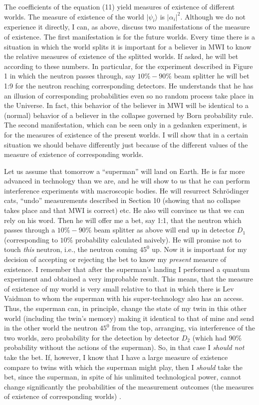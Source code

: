 \documentclass[12pt]{article}
\begin{document}
The coefficients of the equation (11) yield measures of existence of
different worlds. The measure of existence of the world
$|\psi_i\rangle$ is $|\alpha_i|^2$.  Although we do not experience it
directly, I can, as above, discuss two manifestations of the measure
of existence.  The first manifestation is for the future worlds.
Every time there is a situation in which the world splits it is
important for a believer in MWI to know the relative measures of
existence of the splitted worlds.  If asked, he will bet according to
these numbers. In particular, for the experiment described in Figure 1
in which the neutron passes through, say $10\%-90\%$ beam splitter he
will bet 1:9 for the neutron reaching corresponding detectors. He
understands that he has an illusion of corresponding probabilities
even so no random process take place in the Universe. In fact, this
behavior of the believer in MWI will be identical to a (normal)
behavior of a believer in the collapse governed by Born probability
rule.
The second manifestation, which can be seen only in a gedanken
experiment, is for the measures of existence of the present worlds.  I
will show that in a certain situation we should behave differently
just because of the different values of the measure of existence of
corresponding worlds.

Let us assume that tomorrow a ``superman'' will land on Earth. He is
far more advanced in technology than we are, and he will show to us
that he can perform interference experiments with macroscopic bodies.
He will resurrect Schr\"odinger cats, ``undo'' measurements described
in Section 10 (showing that no collapse takes place and that MWI is
correct) etc.  He also will convince us that we can rely on his word.
Then he will offer me a bet, say 1:1, that the neutron which passes
through a $10\%-90\%$ beam splitter as above will end up in detector
$D_1$ (corresponding to $10\%$ probability calculated naively). He
will promise not to touch {\it this} neutron, i.e., the neutron coming
$45^0$ up. Now it is important for my decision of accepting or
rejecting the bet to know my {\it present} measure of existence. I
remember that after the superman's landing I performed a quantum
experiment and obtained a very improbable result. This means, that the
measure of existence of my world is very small relative to that in
which there is Lev Vaidman to whom the superman with his
super-technology also has an access. Thus, the superman can, in
principle, change the state of my twin in this other world (including
the twin's memory) making it identical to that of mine and send in the
other world the neutron $45^0$ from the top, arranging, via
interference of the two worlds, zero probability for the detection by
detector $D_2$ (which had $90\%$ probability without the actions of
the superman). So, in that case I {\it should not} take the bet. If,
however, I know that I have a large measure of existence compare to
twins with which the superman might play, then I {\it should} take the
bet, since the superman, in spite of his unlimited technological
power, cannot change significantly the probabilities of the
measurement outcomes (the measures of existence of corresponding
worlds) .
\end{document}
